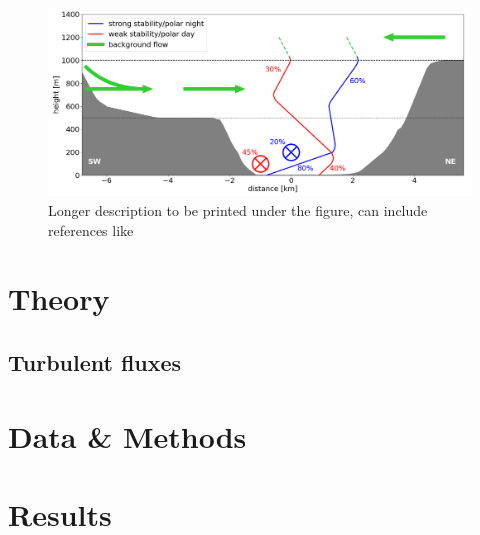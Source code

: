 \documentclass[11pt,bibliography=totoc,openany,numbers=noendperiod]{scrbook}
\begin{document}
\begin{figure}[htbp]		%
    \centering				%
    \includegraphics[width=\textwidth]{./figures_john/schematic_ABL.png}
    \vspace{-20pt}		%
    \caption[Short description for list of figures]{Longer description to be printed under the figure, can include references like \citep{stull1988introduction}} %
	\label{john:fig1}		%
\end{figure}
\lipsum



\section{Theory}
\label{john:theory}
\subsection{Turbulent fluxes}
\label{john:fluxes}
\lipsum


\section{Data \& Methods}
\label{john:methods}
\lipsum

\section{Results}
\label{john:results}
\lipsum
\end{document}
